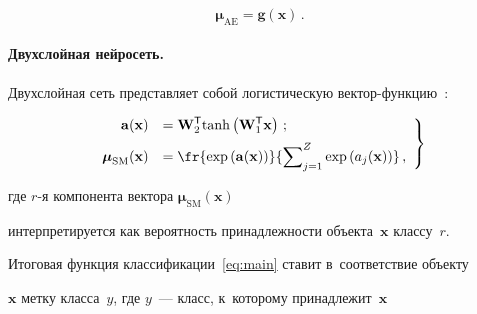 $$


    \mathbf{\boldsymbol{\mu}}_{\mathrm{AE}} = \mathbf{g}(\mathbf{x})\,.


$$





\vspace*{-16pt}





\paragraph*{Двухслойная нейросеть.}


Двухслойная сеть представляет собой логистическую век\-тор-функ\-цию~\cite{sm}:





\noindent


\begin{equation}


\left.


\begin{array}{rl}


 \mathbf{a}(\mathbf{x}) &= \displaystyle\mathbf{W}^{\mathsf{T}}_2 


\mathrm{tanh}\left(\mathbf{W}^{\mathsf{T}}_1 \mathbf{x}\right)\,;


\\[6pt]


 \mathbf{\boldsymbol{\mu}}_{\mathrm{SM}}(\mathbf{x}) &= \displaystyle


\fr{\exp\left(\mathbf{a}(\mathbf{x})\right)}{\sum\nolimits_{j=1}^Z 


\exp\left({a}_j(\mathbf{x})\right)}\,,


\end{array}


\right\}


\label{sm}


\end{equation}


где $r$-я компонента вектора $\mathbf{\boldsymbol{\mu}}_{\mathrm{SM}}(\mathbf{x})$ 


интерпретируется как вероятность принадлежности объекта~$\mathbf{x}$ классу~$r$. 


Итоговая функция классификации~\eqref{eq:main} ставит в~соответствие  объекту 


$\mathbf{x}$ метку класса~$y$, где $y$~--- класс, к~которому принадлежит~$\mathbf{x}$ 


